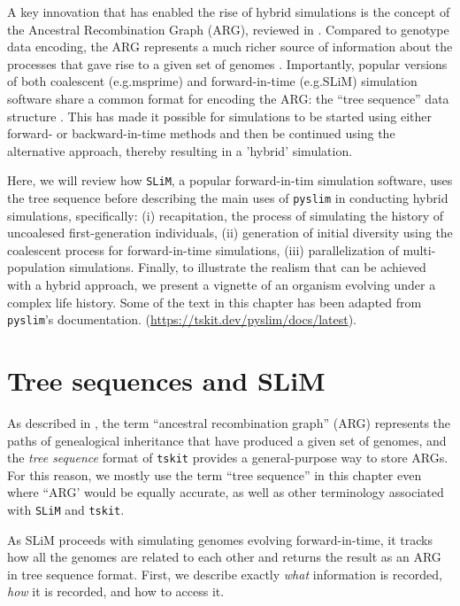 \documentclass[12pt]{article}
\newcommand{\tskit}[0]{\texttt{tskit}\xspace}
\newcommand{\slim}[0]{\texttt{SLiM}\xspace}
\newcommand{\pyslim}[0]{\texttt{pyslim}\xspace}
\newcommand*{\eg}{e.g.\xcomma}
\begin{document}
A key innovation that has enabled the rise of hybrid simulations is the concept of the Ancestral Recombination Graph (ARG), reviewed in \citet{wong_general_2024}.
Compared to genotype data encoding, the ARG represents a much richer source of information about the processes that gave rise to a given set of genomes \citep{kelleher_efficient_2016}.
Importantly, popular versions of both coalescent (\eg msprime) and forward-in-time (\eg SLiM) simulation software share a common format for
encoding the ARG: the ``tree sequence'' data structure \citep{baumdicker_efficient_2022, haller_tree-sequence_2019}.
This has made it possible for simulations to be started using either forward- or backward-in-time
methods and then be continued using the alternative approach, thereby resulting in a 'hybrid' simulation.

Here, we will review how \slim, a popular forward-in-tim simulation software, uses the tree sequence before describing
the main uses of \pyslim in conducting hybrid simulations, specifically:
(i) recapitation, the process of simulating the history of uncoalesed first-generation individuals,
(ii) generation of initial diversity using the coalescent process for forward-in-time simulations,
(iii) parallelization of multi-population simulations.
Finally, to illustrate the realism that can be achieved with a hybrid approach, we present a vignette of an organism evolving under a complex life history.
Some of the text in this chapter has been adapted from \pyslim's documentation.
(\url{https://tskit.dev/pyslim/docs/latest}).

\section{Tree sequences and SLiM}
As described in \citet{wong_general_2024}, the term ``ancestral recombination graph'' (ARG)
represents the paths of genealogical inheritance that have produced a given set of genomes,
and the \emph{tree sequence} format of \tskit provides a general-purpose way to store ARGs.
For this reason, we mostly use the term ``tree sequence'' in this chapter even where ``ARG'
would be equally accurate, as well as other terminology associated with \slim and \tskit \citet{kelleher_efficient_2016,ralph_efficiently_2020,wong_general_2024}.

As SLiM proceeds with simulating genomes evolving forward-in-time, it tracks how all the genomes are
related to each other and returns the result as an ARG in tree sequence format. First, we describe
exactly \emph{what} information is recorded, \emph{how} it is recorded, and how to access it.
\end{document}
